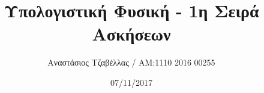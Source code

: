 \documentclass[11pt]{article}
\begin{document}


\title{Υπολογιστική Φυσική - 1η Σειρά Ασκήσεων}
\author{Αναστάσιος Τζαβέλλας / ΑΜ:1110 2016 00255}
\date{07/11/2017}
\maketitle






\end{document}
